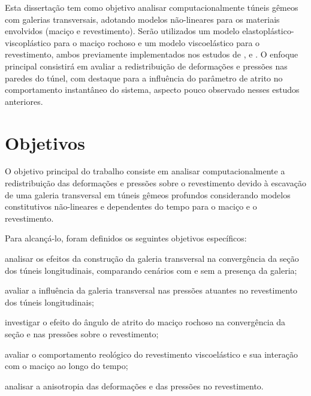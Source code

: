 Esta dissertação tem como objetivo analisar computacionalmente túneis gêmeos com galerias transversais, adotando modelos não-lineares para os materiais envolvidos (maciço e revestimento). Serão utilizados um modelo elastoplástico-viscoplástico para o maciço rochoso e um modelo viscoelástico para o revestimento, ambos previamente implementados nos estudos de ,  e . O enfoque principal consistirá em avaliar a redistribuição de deformações e pressões nas paredes do túnel, com destaque para a influência do parâmetro de atrito no comportamento instantâneo do sistema, aspecto pouco observado nesses estudos anteriores.

%


\section{Objetivos}

O objetivo principal do trabalho consiste em analisar computacionalmente a redistribuição das deformações e pressões sobre o revestimento devido à escavação de uma galeria transversal em túneis gêmeos profundos considerando modelos constitutivos não-lineares e dependentes do tempo para o maciço e o revestimento.

Para alcançá-lo, foram definidos os seguintes objetivos específicos:

\begin{alineas}
	
	\item analisar os efeitos da construção da galeria transversal na convergência da seção dos túneis longitudinais, comparando cenários com e sem a presença da galeria;
	
	\item avaliar a influência da galeria transversal nas pressões atuantes no revestimento dos túneis longitudinais;
	
	\item investigar o efeito do ângulo de atrito do maciço rochoso na convergência da seção e nas pressões sobre o revestimento;
	
	\item avaliar o comportamento reológico do revestimento viscoelástico e sua interação com o maciço ao longo do tempo;
	
	\item analisar a anisotropia das deformações e das pressões no revestimento.

	
\end{alineas}
